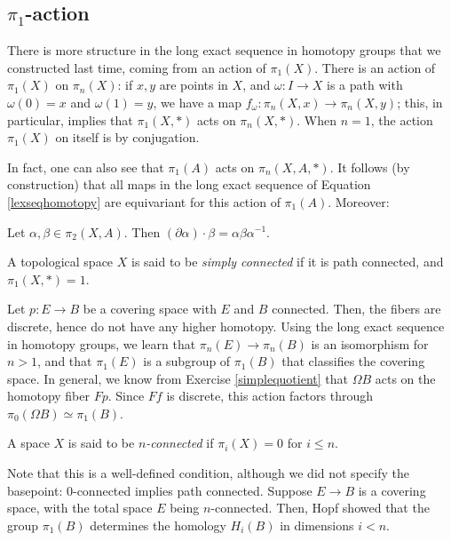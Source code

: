 \subsection{$\pi_1$-action}
There is more structure in the long exact sequence in homotopy groups that we constructed last time, coming from an action
of $\pi_1(X)$.
There is an action of $\pi_1(X)$ on $\pi_n(X)$: if $x,y$ are points in $X$, and $\omega:I\to X$ is a path with $\omega(0) = x$ and $\omega(1) = y$, we have a map $f_\omega:\pi_n(X,x)\to \pi_n(X,y)$;
this, in particular, implies that $\pi_1(X,\ast)$ acts on $\pi_n(X,\ast)$.
When $n=1$, the action $\pi_1(X)$ on itself is by conjugation.

In fact, one can also see that $\pi_1(A)$ acts on $\pi_n(X,A,\ast)$.
It follows (by construction) that all maps in the long exact sequence of Equation \eqref{lexseqhomotopy} are equivariant for
this action of $\pi_1(A)$.
Moreover:
\begin{prop}
    Let $\alpha,\beta\in \pi_2(X,A)$. Then $(\partial \alpha)\cdot\beta = \alpha\beta\alpha^{-1}$.
\end{prop}

\begin{definition}
    A topological space $X$ is said to be \emph{simply connected} if it is path connected, and $\pi_1(X,\ast) = 1$.
\end{definition}
Let $p:E\to B$ be a covering space with $E$ and $B$ connected.
Then, the fibers are discrete, hence do not have any higher homotopy.
Using the long exact sequence in homotopy groups, we learn that $\pi_n(E)\to \pi_n(B)$ is an isomorphism for $n>1$,
and that $\pi_1(E)$ is a subgroup of $\pi_1(B)$ that classifies the covering space.
In general, we know from Exercise \ref{simplequotient} that $\Omega B$ acts on the homotopy fiber $Fp$.
Since $Ff$ is discrete, this action factors through $\pi_0(\Omega B)\simeq \pi_1(B)$.

\begin{definition}
    A space $X$ is said to be \emph{$n$-connected} if $\pi_i(X) = 0$ for $i\leq n$.
\end{definition}
Note that this is a well-defined condition, although we did not specify the basepoint: $0$-connected implies path connected.
Suppose $E\to B$ is a covering space, with the total space $E$ being $n$-connected.
Then, Hopf showed that the group $\pi_1(B)$ determines the homology $H_i(B)$ in dimensions $i<n$.

